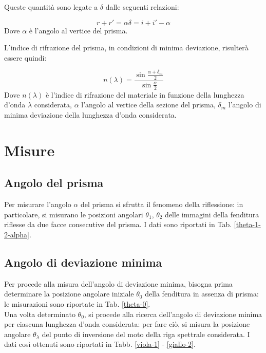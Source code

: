 \documentclass[]{article}
\let\oldsection\section%
\renewcommand{\section}{%
	\renewcommand{\theequation}{\thesection.\arabic{equation}}%
	\oldsection}%
\let\oldsubsection\subsection%
\renewcommand{\subsection}{%
	\renewcommand{\theequation}{\thesubsection.\arabic{equation}}%
	\oldsubsection}%
\begin{document}
    Queste quantità sono legate a $\delta$ dalle seguenti relazioni:

    \begin{equation}
        \label{relazioni_delta}
        r + r' = \alpha
        \delta = i + i' - \alpha
    \end{equation}
    Dove $\alpha$ è l'angolo al vertice del prisma.

    L'indice di rifrazione del prisma, in condizioni di minima deviazione, risulterà essere quindi:

    \begin{equation}
        \label{indice_rifrazione}
        n(\lambda)=\frac{\sin \frac{\alpha + \delta _m} {2}}{\sin \frac{\alpha}{2}}
    \end{equation}
    Dove $n(\lambda)$ è l'indice di rifrazione del materiale in funzione della lunghezza d'onda $\lambda$ considerata, $\alpha$ l'angolo al vertice della sezione del prisma, $\delta _m $ l'angolo di minima deviazione della lunghezza d'onda considerata.

    \section{Misure}
    \label{par:misure}

    \subsection{Angolo del prisma}
    Per misurare l'angolo $\alpha$ del prisma si sfrutta il fenomeno della riflessione: in particolare, si misurano le posizioni angolari $\theta_1$, $\theta_2$ delle immagini della fenditura riflesse da due facce consecutive del prisma. I dati sono riportati in Tab. \ref{theta-1-2-alpha}.

    \subsection{Angolo di deviazione minima}
    Per procede alla misura dell'angolo di deviazione minima, bisogna prima determinare la posizione angolare iniziale $\theta_0$ della fenditura in assenza di prisma: le misurazioni sono riportate in Tab. \ref{theta-0}. \\
    Una volta determinato $\theta_0$, si procede alla ricerca dell'angolo di deviazione minima per ciascuna lunghezza d'onda considerata: per fare ciò, si misura la posizione angolare $\theta_{\lambda}$ del punto di inversione del moto della riga spettrale considerata. I dati così ottenuti sono riportati in Tabb. \ref{viola-1} - \ref{giallo-2}.
\end{document}
